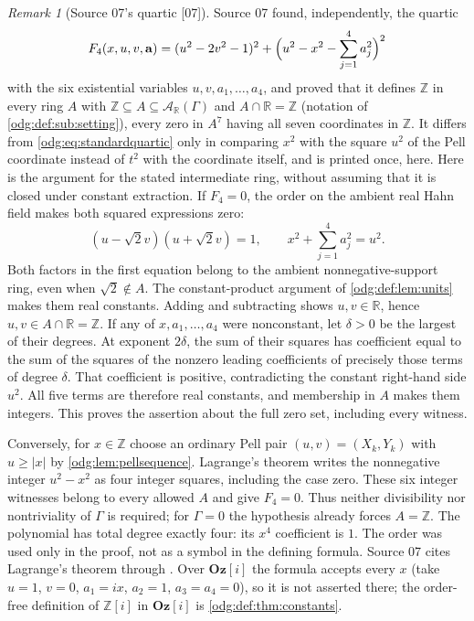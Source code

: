 \documentclass[11pt,oneside]{article}
\numberwithin{equation}{section}
\theoremstyle{definition}
\theoremstyle{remark}
\newtheorem{remark}[remark]{Remark}
\newcommand{\Oz}{\mathbf{Oz}}
\newcommand{\Z}{\mathbb Z}
\newcommand{\R}{\mathbb R}
\newcommand{\src}[1]{\textup{\textsf{\small[#1]}}}
\newcommand{\Og}{\Oz[i]}
\begin{document}
\begin{remark}[Source 07's quartic \src{07}]\label{odg:def:rem:quarticvariant}
Source 07 found, independently, the quartic
\begin{equation}\label{odg:def:eq:F4}
 F_4(x,u,v,\mathbf a)=(u^2-2v^2-1)^2+
 \Bigl(u^2-x^2-\sum_{j=1}^{4}a_j^2\Bigr)^2
\end{equation}
with the six existential variables $u,v,a_1,\ldots,a_4$, and proved that it
defines $\Z$ in every ring $A$ with $\Z\subseteq A\subseteq\mathcal
A_\R(\Gamma)$ and $A\cap\R=\Z$ (notation of \cref{odg:def:sub:setting}), every
zero in $A^7$ having all seven coordinates in $\Z$. It differs from
\eqref{odg:eq:standardquartic} only in comparing $x^2$ with the square $u^2$ of
the Pell coordinate instead of $t^2$ with the coordinate itself, and is printed
once, here. Here is the argument for the stated intermediate ring, without
assuming that it is closed under constant extraction. If $F_4=0$, the
order on the ambient real Hahn field makes both squared expressions zero:
\[
 (u-\sqrt2v)(u+\sqrt2v)=1,\qquad
 x^2+\sum_{j=1}^4a_j^2=u^2.
\]
Both factors in the first equation belong to the ambient nonnegative-support
ring, even when $\sqrt2\notin A$. The constant-product argument of
\cref{odg:def:lem:units} makes them real constants. Adding and subtracting
shows $u,v\in\R$, hence $u,v\in A\cap\R=\Z$.
If any of $x,a_1,\ldots,a_4$ were nonconstant, let $\delta>0$ be the
largest of their degrees. At exponent $2\delta$, the sum of their
squares has coefficient equal to the sum of the squares of the nonzero
leading coefficients of precisely those terms of degree $\delta$.
That coefficient is positive, contradicting the constant right-hand side
$u^2$. All five terms are therefore real constants, and membership in $A$
makes them integers. This proves the assertion about the full zero set,
including every witness.

Conversely, for $x\in\Z$ choose an ordinary Pell pair
$(u,v)=(X_k,Y_k)$ with $u\ge |x|$ by \cref{odg:lem:pellsequence}.
Lagrange's theorem writes the nonnegative integer $u^2-x^2$ as four
integer squares, including the case zero. These six integer witnesses
belong to every allowed $A$ and give $F_4=0$. Thus neither divisibility
nor nontriviality of $\Gamma$ is required; for $\Gamma=0$ the hypothesis
already forces $A=\Z$. The polynomial has total degree exactly four:
its $x^4$ coefficient is $1$. The order was used only in the proof,
not as a symbol in the defining formula. Source 07 cites Lagrange's theorem
through \cite[Section 6]{Conrad}. Over $\Og$ the formula accepts every $x$ (take
$u=1$, $v=0$, $a_1=ix$, $a_2=1$, $a_3=a_4=0$), so it is not asserted there;
the order-free definition of $\Z[i]$ in $\Og$ is
\cref{odg:def:thm:constants}.
\end{remark}
\end{document}
